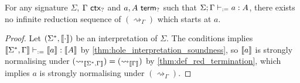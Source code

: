 \documentclass[twoside]{report}
\begin{document}
\begin{proposition}
    \label{thm:hole_red_termination}
    For any signature $\Sigma$, $\Gamma \ \mathsf{ctx}_{?}$ and $a,A \ \mathsf{term}_{?}$ such that $\Sigma; \Gamma \vdash_{:=} a : A$, there exists no infinite reduction sequence of $(\rightsquigarrow_\Gamma)$ which starts at $a$.
\end{proposition}

\begin{proof}
    Let $(\Sigma^\ast, \llbracket{\cdot}\rrbracket)$ be an interpretation of $\Sigma$. The conditions implies $\llbracket{\Sigma^\ast, \Gamma}\rrbracket \vdash_{:=} \llbracket{a}\rrbracket : \llbracket{A}\rrbracket$ by \cref{thm:hole_interpretation_soundness}, so $\llbracket{a}\rrbracket$ is strongly normalising under $(\rightsquigarrow_{\llbracket{\Sigma^\ast, \Gamma}\rrbracket}) = (\rightsquigarrow_{\llbracket{\Gamma}\rrbracket})$ by \cref{thm:def_red_termination}, which implies $a$ is strongly normalising under $(\rightsquigarrow_\Gamma)$.
\end{proof}



\end{document}
